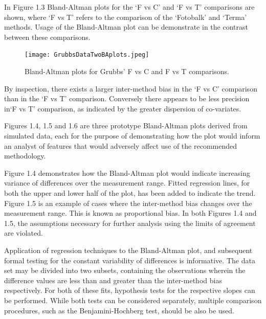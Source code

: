 \documentclass[12pt, a4paper]{report}
\begin{document}
In Figure 1.3 Bland-Altman plots for the `F vs C' and `F vs T'
comparisons are shown, where `F vs T' refers to the comparison of
the `Fotobalk' and `Terma' methods. Usage of the Bland-Altman plot
can be demonstrate in the contrast between these comparisons.

\begin{figure}[h!]
\begin{center}
  \texttt{[image: GrubbsDataTwoBAplots.jpeg]}
  \caption{Bland-Altman plots for Grubbs' F vs C and F vs T comparisons.}\label{GrubbsDataTwoBAplots}
\end{center}
\end{figure}

By inspection, there exists a larger inter-method bias in the `F
vs C' comparison than in the `F vs T' comparison. Conversely there
appears to be less precision in`F vs T' comparison, as indicated
by the greater dispersion of co-variates.

Figures 1.4, 1.5 and 1.6 are three prototype Bland-Altman plots
derived from simulated data, each for the purpose of demonstrating
how the plot would inform an analyst of features that would
adversely affect use of the recommended methodology.

Figure 1.4 demonstrates how the Bland-Altman plot would indicate
increasing variance of differences over the measurement range.
Fitted regression lines, for both the upper and lower half of the
plot, has been added to indicate the trend. Figure 1.5 is an
example of cases where the inter-method bias changes over the
measurement range. This is known as proportional bias. In both
Figures 1.4 and 1.5, the assumptions necessary for further
analysis using the limits of agreement are violated.

Application of regression techniques to the Bland-Altman plot, and
subsequent formal testing for the constant variability of
differences is informative. The data set may be divided into two
subsets, containing the observations wherein the difference values
are less than and greater than the inter-method bias respectively.
For both of these fits, hypothesis tests for the respective slopes
can be performed. While both tests can be considered separately,
multiple comparison procedures, such as the Benjamini-Hochberg
\citep{BH} test, should be also be used.
\end{document}
